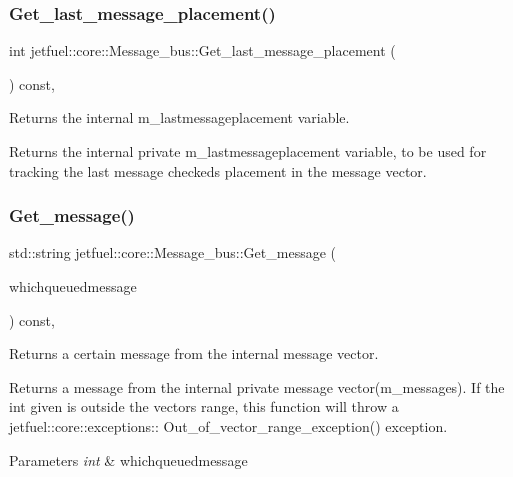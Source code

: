 \subsubsection{\texorpdfstring{Get\+\_\+last\+\_\+message\+\_\+placement()}{Get\_last\_message\_placement()}}
{\footnotesize\ttfamily int jetfuel\+::core\+::\+Message\+\_\+bus\+::\+Get\+\_\+last\+\_\+message\+\_\+placement (\begin{DoxyParamCaption}{ }\end{DoxyParamCaption}) const\hspace{0.3cm}{\ttfamily [inline]}, {\ttfamily [protected]}}



Returns the internal m\+\_\+lastmessageplacement variable. 

Returns the internal private m\+\_\+lastmessageplacement variable, to be used for tracking the last message checked\textquotesingle{}s placement in the message vector. \mbox{\label{classjetfuel_1_1core_1_1Message__bus_a36316ce1a4ddbd9a36c39f82e81a7f23}} 
\subsubsection{\texorpdfstring{Get\+\_\+message()}{Get\_message()}}
{\footnotesize\ttfamily std\+::string jetfuel\+::core\+::\+Message\+\_\+bus\+::\+Get\+\_\+message (\begin{DoxyParamCaption}\item[{const int}]{whichqueuedmessage }\end{DoxyParamCaption}) const\hspace{0.3cm}{\ttfamily [inline]}, {\ttfamily [protected]}}



Returns a certain message from the internal message vector. 

Returns a message from the internal private message vector(m\+\_\+messages). If the int given is outside the vector\textquotesingle{}s range, this function will throw a jetfuel\+::core\+::exceptions\+:\+: Out\+\_\+of\+\_\+vector\+\_\+range\+\_\+exception() exception.


\begin{DoxyParams}{Parameters}
{\em int} & whichqueuedmessage \\
\hline
\end{DoxyParams}
\mbox{\label{classjetfuel_1_1core_1_1Message__bus_a784a11d711a1df93b66416c93b9fd494}} 
